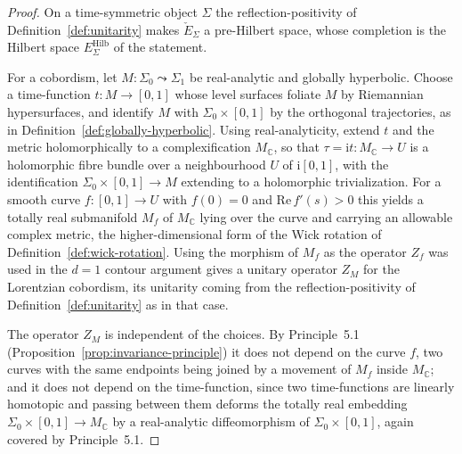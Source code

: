 \begin{proof}
  On a time-symmetric object $\Sigma$ the reflection-positivity of
  Definition~\ref{def:unitarity} makes $\check E_{\Sigma}$ a pre-Hilbert space, whose
  completion is the Hilbert space $E_{\Sigma}^{\mathrm{Hilb}}$ of the statement.

  For a cobordism, let $M \colon \Sigma_0 \leadsto \Sigma_1$ be real-analytic and
  globally hyperbolic. Choose a time-function $t \colon M \to [0,1]$ whose level
  surfaces foliate $M$ by Riemannian hypersurfaces, and identify $M$ with
  $\Sigma_0 \times [0,1]$ by the orthogonal trajectories, as in
  Definition~\ref{def:globally-hyperbolic}. Using real-analyticity, extend $t$ and
  the metric holomorphically to a complexification $M_{\mathbb C}$, so that
  $\tau = \mathrm{i}t \colon M_{\mathbb C} \to U$ is a holomorphic fibre bundle over a
  neighbourhood $U$ of $\mathrm{i}[0,1]$, with the identification
  $\Sigma_0 \times [0,1] \to M$ extending to a holomorphic trivialization. For a
  smooth curve $f \colon [0,1] \to U$ with $f(0) = 0$ and $\mathrm{Re}\, f'(s) > 0$
  this yields a totally real submanifold $M_f$ of $M_{\mathbb C}$ lying over the
  curve and carrying an allowable complex metric, the higher-dimensional form of the
  Wick rotation of Definition~\ref{def:wick-rotation}. Using the morphism of $M_f$ as
  the operator $Z_f$ was used in the $d = 1$ contour argument gives a unitary
  operator $Z_M$ for the Lorentzian cobordism, its unitarity coming from the
  reflection-positivity of Definition~\ref{def:unitarity} as in that case.

  The operator $Z_M$ is independent of the choices. By Principle~5.1
  (Proposition~\ref{prop:invariance-principle}) it does not depend on the curve $f$,
  two curves with the same endpoints being joined by a movement of $M_f$ inside
  $M_{\mathbb C}$; and it does not depend on the time-function, since two
  time-functions are linearly homotopic and passing between them deforms the totally
  real embedding $\Sigma_0 \times [0,1] \to M_{\mathbb C}$ by a real-analytic
  diffeomorphism of $\Sigma_0 \times [0,1]$, again covered by Principle~5.1.
\end{proof}

